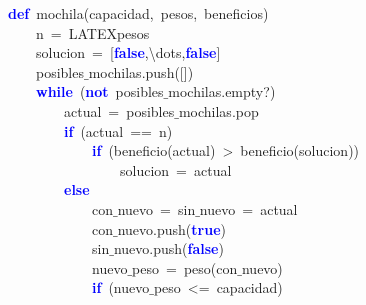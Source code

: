 \noindent
\mbox{}\textbf{\textcolor{Blue}{def}}\ mochila\textcolor{BrickRed}{(}capacidad\textcolor{BrickRed}{,}\ pesos\textcolor{BrickRed}{,}\ beneficios\textcolor{BrickRed}{)} \\
\mbox{}\ \ \ \ n\ \textcolor{BrickRed}{=}\ LATEXpesos \\
\mbox{}\ \ \ \ solucion\ \textcolor{BrickRed}{=}\ \textcolor{BrickRed}{[}\textbf{\textcolor{Blue}{false}}\textcolor{BrickRed}{,\textbackslash{}}dots\textcolor{BrickRed}{,}\textbf{\textcolor{Blue}{false}}\textcolor{BrickRed}{]} \\
\mbox{}\ \ \ \ posibles$\_$mochilas\textcolor{BrickRed}{.}push\textcolor{BrickRed}{([])} \\
\mbox{}\ \ \ \ \textbf{\textcolor{Blue}{while}}\ \textcolor{BrickRed}{(}\textbf{\textcolor{Blue}{not}}\ posibles$\_$mochilas\textcolor{BrickRed}{.}empty?\textcolor{BrickRed}{)} \\
\mbox{}\ \ \ \ \ \ \ \ actual\ \textcolor{BrickRed}{=}\ posibles$\_$mochilas\textcolor{BrickRed}{.}pop \\
\mbox{}\ \ \ \ \ \ \ \ \textbf{\textcolor{Blue}{if}}\ \textcolor{BrickRed}{(}actual\ \textcolor{BrickRed}{==}\ n\textcolor{BrickRed}{)} \\
\mbox{}\ \ \ \ \ \ \ \ \ \ \ \ \textbf{\textcolor{Blue}{if}}\ \textcolor{BrickRed}{(}beneficio\textcolor{BrickRed}{(}actual\textcolor{BrickRed}{)}\ \textcolor{BrickRed}{\textgreater{}}\ beneficio\textcolor{BrickRed}{(}solucion\textcolor{BrickRed}{))} \\
\mbox{}\ \ \ \ \ \ \ \ \ \ \ \ \ \ \ \ solucion\ \textcolor{BrickRed}{=}\ actual \\
\mbox{}\ \ \ \ \ \ \ \ \textbf{\textcolor{Blue}{else}}\  \\
\mbox{}\ \ \ \ \ \ \ \ \ \ \ \ con$\_$nuevo\ \textcolor{BrickRed}{=}\ sin$\_$nuevo\ \textcolor{BrickRed}{=}\ actual \\
\mbox{}\ \ \ \ \ \ \ \ \ \ \ \ con$\_$nuevo\textcolor{BrickRed}{.}push\textcolor{BrickRed}{(}\textbf{\textcolor{Blue}{true}}\textcolor{BrickRed}{)} \\
\mbox{}\ \ \ \ \ \ \ \ \ \ \ \ sin$\_$nuevo\textcolor{BrickRed}{.}push\textcolor{BrickRed}{(}\textbf{\textcolor{Blue}{false}}\textcolor{BrickRed}{)} \\
\mbox{}\ \ \ \ \ \ \ \ \ \ \ \ nuevo$\_$peso\ \textcolor{BrickRed}{=}\ peso\textcolor{BrickRed}{(}con$\_$nuevo\textcolor{BrickRed}{)} \\
\mbox{}\ \ \ \ \ \ \ \ \ \ \ \ \textbf{\textcolor{Blue}{if}}\ \textcolor{BrickRed}{(}nuevo$\_$peso\ \textcolor{BrickRed}{\textless{}=}\ capacidad\textcolor{BrickRed}{)} \\
